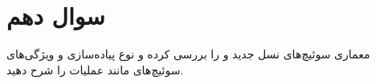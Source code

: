 \section{سوال دهم}

معماری سوئیچ‌های نسل جدید  و  را بررسی کرده و نوع پیاده‌سازی و ویژگی‌های سوئیچ‌های  مانند عملیات  را شرح دهید.